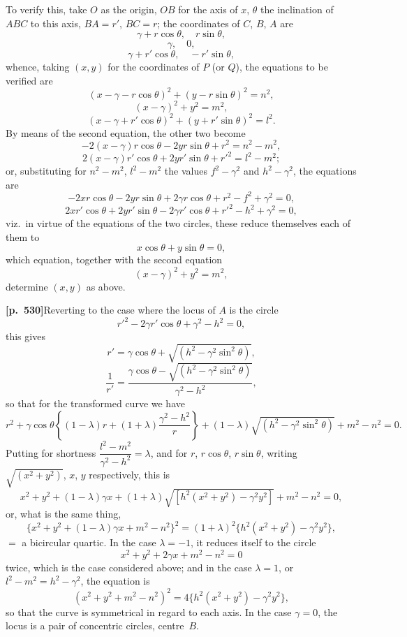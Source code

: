 \documentclass[11pt,a4paper]{article}
\begin{document}
To verify this, take $O$ as the origin, $OB$ for the axis of $x$, $\theta$ the inclination of $ABC$ to this axis, $BA = r'$, $BC = r$; the coordinates of $C$, $B$, $A$ are
\[
\gamma + r\cos\theta, \quad r\sin\theta,
\]
\[
\gamma, \quad 0,
\]
\[
\gamma + r'\cos\theta, \quad - r'\sin\theta,
\]
whence, taking $(x, y)$ for the coordinates of $P$ (or $Q$), the equations to be verified are
\[
(x - \gamma - r\cos\theta)^{2} + (y - r\sin\theta)^{2} = n^{2},
\]
\[
(x - \gamma)^{2} + y^{2} = m^{2},
\]
\[
(x - \gamma + r'\cos\theta)^{2} + (y + r'\sin\theta)^{2} = l^{2}.
\]
By means of the second equation, the other two become
\[
- 2(x - \gamma) r\cos\theta - 2 y r \sin\theta + r^{2} = n^{2} - m^{2},
\]
\[
2(x - \gamma) r'\cos\theta + 2 y r' \sin\theta + r'^{2} = l^{2} - m^{2};
\]
or, substituting for $n^{2} - m^{2}$, $l^{2} - m^{2}$ the values $f^{2} - \gamma^{2}$ and $h^{2} - \gamma^{2}$, the equations are
\[
- 2 x r \cos\theta - 2 y r \sin\theta + 2\gamma r \cos\theta + r^{2} - f^{2} + \gamma^{2} = 0,
\]
\[
2 x r' \cos\theta + 2 y r' \sin\theta - 2\gamma r' \cos\theta + r'^{2} - h^{2} + \gamma^{2} = 0,
\]
viz.\ in virtue of the equations of the two circles, these reduce themselves each of them to
\[
x \cos\theta + y \sin\theta = 0,
\]
which equation, together with the second equation
\[
(x - \gamma)^{2} + y^{2} = m^{2},
\]
determine $(x, y)$ as above.

\bigskip

\noindent\textbf{[p.~530]}\quad Reverting to the case where the locus of $A$ is the circle
\[
r'^{2} - 2\gamma r' \cos\theta + \gamma^{2} - h^{2} = 0,
\]
this gives
\[
r' = \gamma\cos\theta + \sqrt{(h^{2} - \gamma^{2}\sin^{2}\theta)},
\]
\[
\frac{1}{r'} = \frac{\gamma\cos\theta - \sqrt{(h^{2} - \gamma^{2}\sin^{2}\theta)}}{\gamma^{2} - h^{2}},
\]
so that for the transformed curve we have
\[
r^{2} + \gamma\cos\theta\left\{ (1 - \lambda) r + (1 + \lambda)\frac{\gamma^{2} - h^{2}}{r} \right\} + (1 - \lambda)\sqrt{(h^{2} - \gamma^{2}\sin^{2}\theta)} + m^{2} - n^{2} = 0.
\]
Putting for shortness $\dfrac{l^{2} - m^{2}}{\gamma^{2} - h^{2}} = \lambda$, and for $r$, $r\cos\theta$, $r\sin\theta$, writing $\sqrt{(x^{2} + y^{2})}$, $x$, $y$ respectively, this is
\[
x^{2} + y^{2} + (1 - \lambda)\gamma x + (1 + \lambda)\sqrt{[h^{2}(x^{2} + y^{2}) - \gamma^{2} y^{2}]} + m^{2} - n^{2} = 0,
\]
or, what is the same thing,
\[
\{x^{2} + y^{2} + (1 - \lambda)\gamma x + m^{2} - n^{2}\}^{2} = (1 + \lambda)^{2}\{h^{2}(x^{2} + y^{2}) - \gamma^{2} y^{2}\},
\]
$=$ a bicircular quartic. In the case $\lambda = -1$, it reduces itself to the circle
\[
x^{2} + y^{2} + 2\gamma x + m^{2} - n^{2} = 0
\]
twice, which is the case considered above; and in the case $\lambda = 1$, or $l^{2} - m^{2} = h^{2} - \gamma^{2}$, the equation is
\[
(x^{2} + y^{2} + m^{2} - n^{2})^{2} = 4\{h^{2}(x^{2} + y^{2}) - \gamma^{2} y^{2}\},
\]
so that the curve is symmetrical in regard to each axis. In the case $\gamma = 0$, the locus is a pair of concentric circles, centre~$B$.
\end{document}
